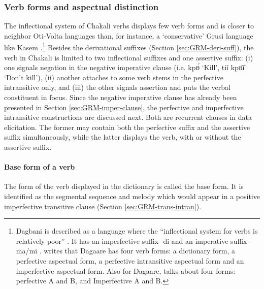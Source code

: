 \begin{exe}
\begin{exe}
\begin{exe}
{\begin{exe}
\begin{exe}
\begin{exe}
\begin{exe}
\begin{exe}
\begin{exe}
\begin{exe}
\begin{exe}
\begin{exe}
\begin{exe}
\begin{exe}
\begin{exe}
\begin{exe}
\begin{exe}
\begin{exe}
\begin{exe}
\begin{exe}
\begin{exe}
\begin{exe}
\subsubsection{Verb forms and aspectual distinction}
\label{sec:GRM-verb-word}

The inflectional system of Chakali verbs displays  few verb
forms and is closer  to neighbor Oti-Volta languages than, for instance,  a
`conservative' Grusi language like Kasem \citep[51]{Bonv88}.\footnote{Dagbani is
described as a language where the ``inflectional system  for verbs is relatively
poor''  \citep[96]{Olaw99}. It has an imperfective suffix {\sls -di}
\citep[97]{Olaw99} and  an imperative suffix {\sls -ma}/{\sls mi} 
\citep[101]{Olaw99}.
\citet[81]{Bodo97} writes that Dagaare has four verb forms: a dictionary
form, a perfective aspectual form, a perfective intransitive aspectual form and
an imperfective aspectual form. Also for Dagaare, \citet{Saan03}  talks about
four forms: perfective A and B, and Imperfective A  and B.}  Besides the
derivational suffixes (Section \ref{sec:GRM-deri-suff}), the verb in Chakali is
limited to two
inflectional suffixes and one assertive suffix:  (i) one signals negation in the
negative imperative clause (i.e.  {\sls  kpʊ́} `Kill',  {\sls tíí kpʊ̄ɪ̄} 
`Don't
kill'),  (ii) another attaches to some verb stems in the perfective intransitive
only, and (iii)  the other signals assertion and puts the verbal constituent in
focus. Since the negative imperative clause has already been presented in
Section
\ref{sec:GRM-imper-clause}, the perfective and imperfective intransitive
constructions are discussed next.  Both are recurrent clauses in data
elicitation. The former may contain both the perfective
suffix and the assertive suffix simultaneously, while the latter  displays the
 verb, with or without the assertive suffix.
 
 
 
\paragraph{Base form of a verb}
\label{sec:GRM-base-verb}


The form of the verb displayed in the dictionary is called the base form.  It  
is identified as the segmental sequence and melody which  would appear in a
positive imperfective transitive clause (Section \ref{sec:GRM-trans-intran}). 



\end{exe}
\end{exe}
\end{exe}
\end{exe}
\end{exe}
\end{exe}
\end{exe}
\end{exe}
\end{exe}
\end{exe}
\end{exe}
\end{exe}
\end{exe}
\end{exe}
\end{exe}
\end{exe}
\end{exe}
\end{exe}
\end{exe}}
\end{exe}
\end{exe}
\end{exe}
